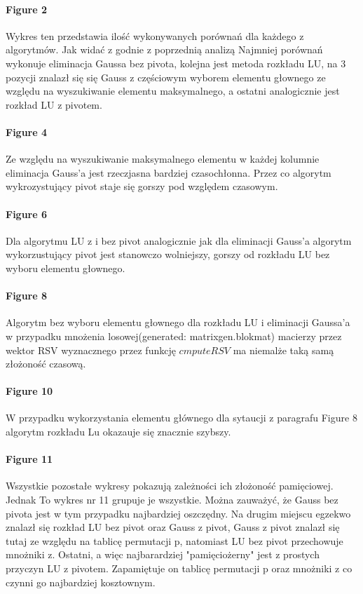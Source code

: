 \documentclass[11pt]{article}
\begin{document}
\begin{flushleft}
\begin{flushleft}
\paragraph{Figure 2}
Wykres ten przedstawia ilość wykonywanych porównań dla każdego z algorytmów. Jak widać z godnie z poprzednią analizą Najmniej porównań wykonuje eliminacja Gaussa bez pivota, kolejna jest metoda rozkładu LU, na 3 pozycji znalazł się się Gauss z częściowym wyborem elementu głownego ze względu na wyszukiwanie elementu maksymalnego, a ostatni analogicznie jest rozkład LU z pivotem.
\paragraph{Figure 4}
Ze względu na wyszukiwanie maksymalnego elementu w każdej kolumnie eliminacja Gauss'a jest rzeczjasna bardziej czasochłonna. Przez co algorytm wykrozystujący pivot staje się gorszy pod względem czasowym.
\paragraph{Figure 6}
Dla algorytmu LU z i bez pivot analogicznie jak dla eliminacji Gauss'a algorytm wykorzustujący pivot jest stanowczo wolniejszy, gorszy od rozkładu LU bez wyboru elementu głownego.
\paragraph{Figure 8}
Algorytm bez wyboru elementu głownego dla rozkładu LU i eliminacji Gaussa'a w przypadku mnożenia losowej(generated: matrixgen.blokmat) macierzy przez wektor RSV wyznacznego przez funkcję $cmputeRSV$ ma niemalże taką samą złożoność czasową.
\paragraph{Figure 10}
W przypadku wykorzystania elementu głównego dla sytaucji z paragrafu Figure 8 algorytm rozkładu Lu okazauje się znacznie szybszy.
\paragraph{Figure 11}
Wszystkie pozostałe wykresy pokazują zależności ich złożoność pamięciowej. Jednak To wykres nr 11 grupuje je wszystkie. Można zauważyć, że Gauss bez pivota jest w tym przypadku najbardziej oszczędny. Na drugim miejscu egzekwo znalazł się rozkład LU bez pivot oraz Gauss z pivot, Gauss z pivot znalazł się tutaj ze względu na tablicę permutacji p, natomiast LU bez pivot przechowuje mnożniki z. Ostatni, a więc najbarardziej "pamięciożerny" jest z prostych przyczyn LU z pivotem. Zapamiętuje on tablicę permutacji p oraz mnożniki z co czynni go najbardziej kosztownym.
\end{flushleft}
\end{flushleft}
\end{document}
